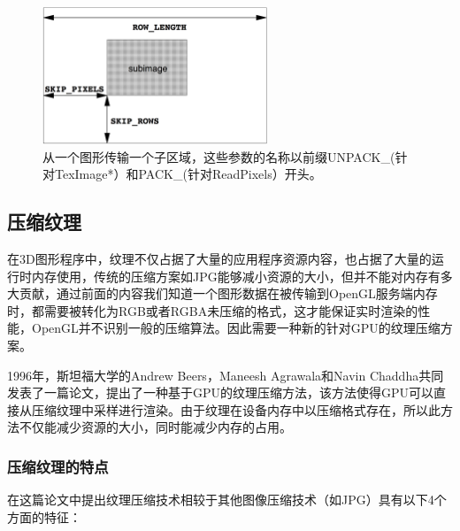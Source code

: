\begin{figure}
\sidecaption
	\includegraphics[width=0.6\textwidth]{figures/api/PixelStore}
	\caption{从一个图形传输一个子区域，这些参数的名称以前缀UNPACK\_(针对TexImage*）和PACK\_(针对ReadPixels）开头。}
	\label{f:api-pixel-store}
\end{figure}





\subsection{压缩纹理}\label{sec:api-compressed-texture}
在3D图形程序中，纹理不仅占据了大量的应用程序资源内容，也占据了大量的运行时内存使用，传统的压缩方案如JPG能够减小资源的大小，但并不能对内存有多大贡献，通过前面的内容我们知道一个图形数据在被传输到OpenGL服务端内存时，都需要被转化为RGB或者RGBA未压缩的格式，这才能保证实时渲染的性能，OpenGL并不识别一般的压缩算法。因此需要一种新的针对GPU的纹理压缩方案。

1996年，斯坦福大学的Andrew Beers，Maneesh Agrawala和Navin Chaddha共同发表了一篇论文\cite{a:RenderingfromCompressedTextures}，提出了一种基于GPU的纹理压缩方法，该方法使得GPU可以直接从压缩纹理中采样进行渲染。由于纹理在设备内存中以压缩格式存在，所以此方法不仅能减少资源的大小，同时能减少内存的占用。

\subsubsection{压缩纹理的特点}
在这篇论文中提出纹理压缩技术相较于其他图像压缩技术（如JPG）具有以下4个方面的特征：

